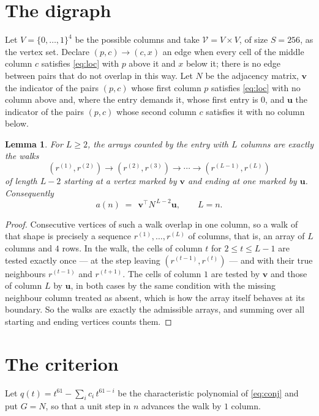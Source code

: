 \documentclass[11pt,a4paper]{article}
\theoremstyle{plain}
\newtheorem{lemma}[theorem]{Lemma}
\theoremstyle{definition}
\begin{document}
\section{The digraph}

Let $V=\{0,\dots,1\}^{4}$ be the possible columns and take
$\mathcal V=V\times V$, of size $S=256$, as the vertex set. Declare $(p,c)\to(c,x)$ an edge
when every cell of the middle column $c$ satisfies \eqref{eq:loc} with $p$ above it and $x$
below it; there is no edge between pairs that do not overlap in this way. Let $N$ be the
adjacency matrix, $\mathbf{v}$ the indicator of the pairs $(p,c)$ whose first column $p$
satisfies \eqref{eq:loc} with no column above and, where the entry demands it, whose first entry is $0$, and $\mathbf{u}$ the indicator of
the pairs $(p,c)$ whose second column $c$ satisfies it with no column below.

\begin{lemma}\label{lem:walk}
For $L\ge2$, the arrays counted by the entry with $L$ columns are exactly the walks
\[
(r^{(1)},r^{(2)})\to(r^{(2)},r^{(3)})\to\cdots\to(r^{(L-1)},r^{(L)})
\]
of length $L-2$ starting at a vertex marked by $\mathbf{v}$ and ending at one marked by
$\mathbf{u}$. Consequently
\[
a(n)\;=\;\,\mathbf{v}^{\!\top}N^{\,L-2}\mathbf{u},\qquad L=n .
\]
\end{lemma}

\begin{proof}
Consecutive vertices of such a walk overlap in one column, so a walk of that shape is
precisely a sequence $r^{(1)},\dots,r^{(L)}$ of columns, that is, an array of $L$ columns
and $4$ rows. In the walk, the cells of column $t$ for $2\le t\le L-1$ are tested
exactly once --- at the step leaving $(r^{(t-1)},r^{(t)})$ --- and with their true
neighbours $r^{(t-1)}$ and $r^{(t+1)}$. The cells of column $1$ are tested by
$\mathbf{v}$ and those of column $L$ by $\mathbf{u}$, in both cases by the same condition
with the missing neighbour column treated as absent, which is how the array itself behaves at
its boundary. So the walks are exactly the admissible arrays, and summing over all starting
and ending vertices counts them.
\end{proof}

\section{The criterion}

Let $q(t)=t^{61}-\sum_i c_i\,t^{61-i}$ be the characteristic polynomial of
\eqref{eq:conj} and put $G=N$, so that a unit step in $n$ advances the walk by
$1$ column.
\end{document}
